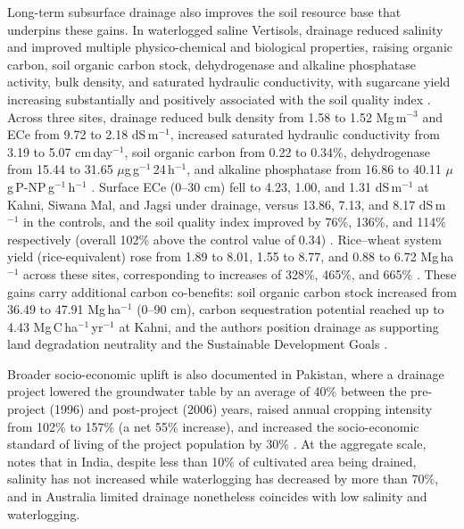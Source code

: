 Long-term subsurface drainage also improves the soil resource base that underpins these gains. In waterlogged saline Vertisols, drainage reduced salinity and improved multiple physico-chemical and biological properties, raising organic carbon, soil organic carbon stock, dehydrogenase and alkaline phosphatase activity, bulk density, and saturated hydraulic conductivity, with sugarcane yield increasing substantially and positively associated with the soil quality index \parencite{Mukhopadhyay2023}. Across three sites, drainage reduced bulk density from 1.58 to 1.52 Mg\,m$^{-3}$ and ECe from 9.72 to 2.18 dS\,m$^{-1}$, increased saturated hydraulic conductivity from 3.19 to 5.07 cm\,day$^{-1}$, soil organic carbon from 0.22 to 0.34\%, dehydrogenase from 15.44 to 31.65 $\mu$g\,g$^{-1}$\,24\,h$^{-1}$, and alkaline phosphatase from 16.86 to 40.11 $\mu$g\,P-NP\,g$^{-1}$\,h$^{-1}$ \parencite{Mukhopadhyay2023b}. Surface ECe (0--30 cm) fell to 4.23, 1.00, and 1.31 dS\,m$^{-1}$ at Kahni, Siwana Mal, and Jagsi under drainage, versus 13.86, 7.13, and 8.17 dS\,m$^{-1}$ in the controls, and the soil quality index improved by 76\%, 136\%, and 114\% respectively (overall 102\% above the control value of 0.34) \parencite{Mukhopadhyay2023b}. Rice--wheat system yield (rice-equivalent) rose from 1.89 to 8.01, 1.55 to 8.77, and 0.88 to 6.72 Mg\,ha$^{-1}$ across these sites, corresponding to increases of 328\%, 465\%, and 665\% \parencite{Mukhopadhyay2023b}. These gains carry additional carbon co-benefits: soil organic carbon stock increased from 36.49 to 47.91 Mg\,ha$^{-1}$ (0--90 cm), carbon sequestration potential reached up to 4.43 Mg\,C\,ha$^{-1}$\,yr$^{-1}$ at Kahni, and the authors position drainage as supporting land degradation neutrality and the Sustainable Development Goals \parencite{Mukhopadhyay2023b,Mukhopadhyay2023}.

Broader socio-economic uplift is also documented in Pakistan, where a drainage project lowered the groundwater table by an average of 40\% between the pre-project (1996) and post-project (2006) years, raised annual cropping intensity from 102\% to 157\% (a net 55\% increase), and increased the socio-economic standard of living of the project population by 30\% \parencite{Ghumman2011}. At the aggregate scale, \textcite{Valipour2014} notes that in India, despite less than 10\% of cultivated area being drained, salinity has not increased while waterlogging has decreased by more than 70\%, and in Australia limited drainage nonetheless coincides with low salinity and waterlogging.

